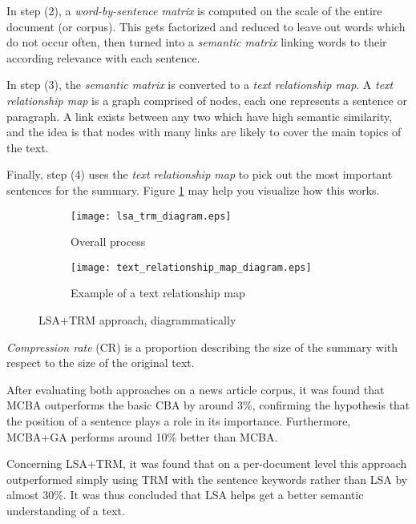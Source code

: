 In step (2), a \textit{word-by-sentence matrix} is computed on the scale of the entire document (or corpus). This  gets factorized and reduced to leave out words which do not occur often, then turned into a \textit{semantic matrix} linking words to their according relevance with each sentence.

In step (3), the \textit{semantic matrix} is converted to a \textit{text relationship map}. A \textit{text relationship map} is a graph comprised of nodes, each one represents a sentence or paragraph. A link exists between any two which have high semantic similarity, and the idea is that nodes with many links are likely to cover the main topics of the text.

Finally, step (4) uses the \textit{text relationship map} to pick out the most important sentences for the summary. Figure \ref{fig:lsa_trm_diagrams} may help you visualize how this works.

\begin{figure}[H]
\begin{subfigure}{0.5\textwidth}
\texttt{[image: lsa\_trm\_diagram.eps]}
\caption{\cite{yeh_text_2005} Overall process}
\end{subfigure}
\begin{subfigure}{0.5\textwidth}
\texttt{[image: text\_relationship\_map\_diagram.eps]}
\caption{\cite{yeh_text_2005} Example of a text relationship map}
\end{subfigure}
\caption{LSA+TRM approach, diagrammatically}
\label{fig:lsa_trm_diagrams}
\end{figure}

\textit{Compression rate} (CR) is a proportion describing the size of the summary with respect to the size of the original text.

After evaluating both approaches on a news article corpus, it was found that MCBA outperforms the basic CBA by around 3\%, confirming the hypothesis that the position of a sentence plays a role in its importance. Furthermore, MCBA+GA performs around 10\% better than MCBA.%

Concerning LSA+TRM, it was found that on a per-document level this approach outperformed simply using TRM with the sentence keywords rather than LSA by almost 30\%. It was thus concluded that LSA helps get a better semantic understanding of a text.%

